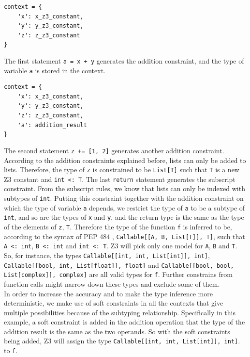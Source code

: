 \begin{lstlisting}
context = {
	'x': x_z3_constant,
	'y': y_z3_constant,
	'z': z_z3_constant
}
\end{lstlisting}
The first statement \lstinline|a = x + y| generates the addition constraint, and the type of variable \lstinline|a| is stored in the context.
\begin{lstlisting}
context = {
	'x': x_z3_constant,
	'y': y_z3_constant,
	'z': z_z3_constant,
	'a': addition_result
}
\end{lstlisting}
The second statement \lstinline|z += [1, 2]| generates another addition constraint. According to the addition constraints explained before, lists can only be added to lists. Therefore, the type of \lstinline|z| is constrained to be \lstinline|List[T]| such that \lstinline|T| is a new Z3 constant and \lstinline|int <: T|. The last \lstinline|return| statement generates the subscript constraint. From the subscript rules, we know that lists can only be indexed with subtypes of \lstinline|int|. Putting this constraint together with the addition constraint on which the type of variable \lstinline|a| depends, we restrict the type of \lstinline|a| to be a subtype of \lstinline|int|, and so are the types of \lstinline|x| and \lstinline|y|, and the return type is the same as the type of the elements of \lstinline|z|, \lstinline|T|. Therefore the type of the function \lstinline|f| is inferred to be, according to the syntax of PEP 484 \cite{484}, \lstinline|Callable[[A, B, List[T]], T]|, such that \lstinline|A <: int|, \lstinline|B <: int| and \lstinline|int <: T|. Z3 will pick only one model for \lstinline|A|, \lstinline|B| and \lstinline|T|. So, for instance, the types \lstinline|Callable[[int, int, List[int]], int]|, \lstinline|Callable[[bool, int, List[float]], float]| and \lstinline|Callable[[bool, bool, List[complex]], complex]| are all valid types for \lstinline|f|. Further constrains from function calls might narrow down these types and exclude some of them.\\

In order to increase the accuracy and to make the type inference more deterministic, we make use of soft constraints in all the contexts that give multiple possibilities because of the subtyping relationship. Specifically in this example, a soft constraint is added in the  addition operation that the type of the addition result is the same as the two operands. So with the soft constraints being added, Z3 will assign the type \lstinline|Callable[[int, int, List[int]], int]|. to \lstinline|f|.

